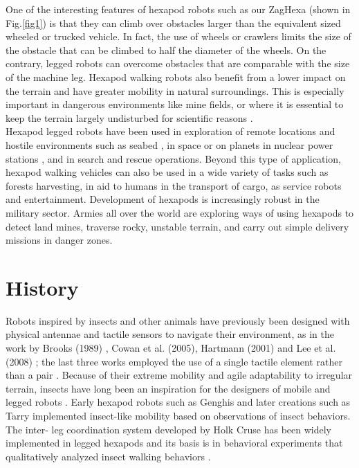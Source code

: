 One of the interesting features of hexapod robots such as our ZagHexa (shown in Fig.\ref{fig1}) is that they can climb over obstacles larger than the equivalent sized wheeled or trucked vehicle. In fact, the use of wheels or crawlers limits the size of the obstacle that can be climbed to half the diameter of the wheels. On the contrary, legged robots can overcome obstacles that are comparable with the size of the machine leg\cite{2}. Hexapod walking robots also benefit from a lower impact on the terrain and have greater mobility in natural surroundings. This is especially important in dangerous environments like mine fields, or where it is essential to keep the terrain largely undisturbed for scientific reasons \cite{3}. \\

Hexapod legged robots have been used in exploration of remote locations and hostile environments such as seabed \cite{4}, in space or on planets \cite{5,6}  in nuclear power stations \cite{7}, and in search and rescue operations\cite{8}. Beyond this type of application, hexapod walking vehicles can also be used in a wide variety of tasks such as forests harvesting, in aid to humans in the transport of cargo, as service robots and entertainment. Development of hexapods is increasingly robust in the military sector. Armies all over the world are exploring ways of using hexapods to detect land mines, traverse rocky, unstable terrain, and carry out simple delivery missions in danger zones.

\section{History} 
Robots inspired by insects and other animals have previously been designed with physical antennae and tactile sensors to navigate their environment, as in the work by Brooks (1989) \cite{20,22}, Cowan et al. (2005), Hartmann (2001) \cite{27} and Lee et al. (2008) \cite{10}; the last three works employed the use of a single tactile element rather than a pair \cite{13}.
Because of their extreme mobility and agile adaptability to irregular terrain, insects have long been an inspiration for the designers of mobile and legged robots \cite{11,14}. Early hexapod robots such as Genghis and later creations such as Tarry implemented insect-like mobility based on observations of insect behaviors. The inter- leg coordination system developed by Holk Cruse \cite{30,23}  has been widely implemented   in legged hexapods and its basis is in behavioral experiments that qualitatively analyzed insect walking behaviors \cite{18}.

